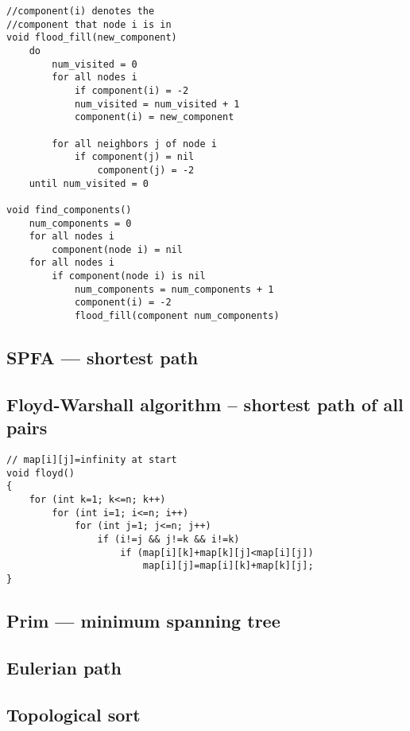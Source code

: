 \documentclass[a4paper]{article}
\begin{document}
\begin{verbatim}
//component(i) denotes the
//component that node i is in
void flood_fill(new_component) 
	do
		num_visited = 0
		for all nodes i
			if component(i) = -2
			num_visited = num_visited + 1
			component(i) = new_component
		
		for all neighbors j of node i
			if component(j) = nil
				component(j) = -2
	until num_visited = 0 

void find_components()
	num_components = 0
	for all nodes i
		component(node i) = nil
	for all nodes i
		if component(node i) is nil
			num_components = num_components + 1
			component(i) = -2
			flood_fill(component num_components)
\end{verbatim}

\subsection{SPFA --- shortest path}

\subsection{Floyd-Warshall algorithm -- shortest path of all pairs}

\begin{verbatim}
// map[i][j]=infinity at start
void floyd()
{
	for (int k=1; k<=n; k++)
		for (int i=1; i<=n; i++)
			for (int j=1; j<=n; j++)
				if (i!=j && j!=k && i!=k)
					if (map[i][k]+map[k][j]<map[i][j])
						map[i][j]=map[i][k]+map[k][j];
}
\end{verbatim}

\subsection{Prim --- minimum spanning tree}

\subsection{Eulerian path}

\subsection{Topological sort}
\end{document}
